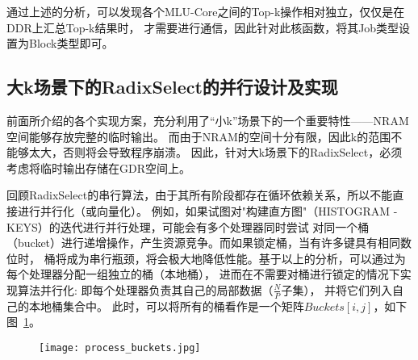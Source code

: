 通过上述的分析，可以发现各个MLU-Core之间的Top-k操作相对独立，仅仅是在DDR上汇总Top-k结果时，
才需要进行通信，因此针对此核函数，将其Job类型设置为Block类型即可。


  \subsection{大k场景下的RadixSelect的并行设计及实现}

  前面所介绍的各个实现方案，充分利用了“小k”场景下的一个重要特性——NRAM空间能够存放完整的临时输出。
  而由于NRAM的空间十分有限，因此k的范围不能够太大，否则将会导致程序崩溃。
  因此，针对大k场景下的RadixSelect，必须考虑将临时输出存储在GDR空间上。
  
  回顾RadixSelect的串行算法，由于其所有阶段都存在循环依赖关系，所以不能直接进行并行化（或向量化）。
  例如，如果试图对"构建直方图"（HISTOGRAM - KEYS）的迭代进行并行处理，可能会有多个处理器同时尝试
  对同一个桶（bucket）进行递增操作，产生资源竞争。而如果锁定桶，当有许多键具有相同数位时，
  桶将成为串行瓶颈，将会极大地降低性能。基于以上的分析，可以通过为每个处理器分配一组独立的桶（本地桶），
进而在不需要对桶进行锁定的情况下实现算法并行化:
即每个处理器负责其自己的局部数据（\(\frac{N}{P}\)子集），
并将它们列入自己的本地桶集合中。
此时，可以将所有的桶看作是一个矩阵\(Buckets[i, j]\)，如下图~\ref{fig:process_bucket}。

\begin{figure}[ht]
    \centering
    \texttt{[image: process\_buckets.jpg]}
    \caption{}
    \label{fig:process_bucket}
\end{figure}

